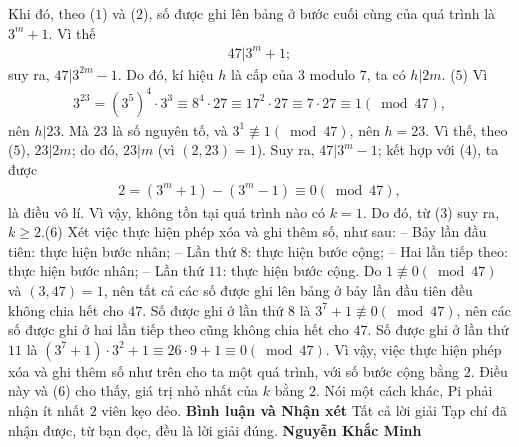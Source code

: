 \begin{multicols}{2}
	\vskip 0.05cm
	Khi đó, theo ($1$) và ($2$), số được ghi lên bảng ở bước cuối cùng của quá trình là $3^m + 1$. Vì thế
	\begin{align*}
		47|{3^m} + 1; \tag{$4$}
	\end{align*}
	suy ra,  $47|{3^{2m}} - 1$. Do đó, kí hiệu $h$ là cấp của $3$ modulo $7$, ta có  $h|2m$. \hfill   ($5$)
	\vskip 0.05cm
	Vì
	\begin{align*}
		{3^{23}} = {\left( {{3^5}} \right)^4} \cdot {3^3} \equiv {8^4} \cdot 27 \equiv {17^2} \cdot 27 \equiv 7 \cdot 27 \equiv 1\left( {\bmod 47} \right),
	\end{align*}
	nên $h|23$.  Mà $23$ là số nguyên tố, và ${3^1}\not  \equiv 1\left( {\bmod 47} \right)$,  nên $h = 23$. Vì thế, theo ($5$),  $23|2m$; do đó, $23|m$  (vì $(2, 23) = 1$). Suy ra, $47|3^m-1$; kết hợp với ($4$), ta được
	\begin{align*}
		2 = \left( {{3^m} + 1} \right) - \left( {{3^m} - 1} \right) \equiv 0\left( {\bmod 47} \right),
	\end{align*}
	là điều vô lí.
	\vskip 0.05cm
	Vì vậy, không tồn tại quá trình nào có $k = 1$. Do đó, từ ($3$) suy ra, $k \ge 2$.\hfill      ($6$)
	\vskip 0.05cm
	Xét việc thực hiện phép xóa và ghi thêm số, như sau:
	\vskip 0.05cm
	-- Bảy lần đầu tiên: thực hiện bước nhân;
	\vskip 0.05cm
	-- Lần thứ $8$: thực hiện bước cộng;
	\vskip 0.05cm
	-- Hai lần tiếp theo: thực hiện bước nhân;
	\vskip 0.05cm
	-- Lần thứ $11$: thực hiện bước cộng.
	\vskip 0.05cm
	Do $1\not  \equiv 0\left( {\bmod 47} \right)$  và $(3, 47) = 1$, nên tất cả các số được ghi lên bảng ở bảy lần đầu tiên đều không chia hết cho $47$.
	\vskip 0.05cm
	Số được ghi ở lần thứ $8$ là  ${3^7} + 1\not  \equiv 0\left( {\bmod 47} \right)$, nên các số được ghi ở hai lần tiếp theo cũng không chia hết cho $47$.
	\vskip 0.05cm
	Số được ghi ở lần thứ $11$ là  $\left( {{3^7} + 1} \right) \cdot {3^2} + 1 \equiv 26 \cdot 9 + 1 \equiv 0\left( {\bmod 47} \right)$.
	\vskip 0.05cm
	Vì vậy, việc thực hiện phép xóa và ghi thêm số như trên cho ta một quá trình, với số bước cộng bằng $2$. Điều này và ($6$) cho thấy, giá trị nhỏ nhất của $k$ bằng $2$. Nói một cách khác, Pi phải nhận ít nhất $2$ viên kẹo dẻo.
	\vskip 0.05cm
	\textbf{Bình luận và Nhận xét}
	\vskip 0.05cm
	Tất cả lời giải Tạp chí đã nhận được, từ bạn đọc, đều là lời giải đúng.
	\vskip 0.05cm
	\hfill\textbf{Nguyễn Khắc Minh}
\end{multicols}
